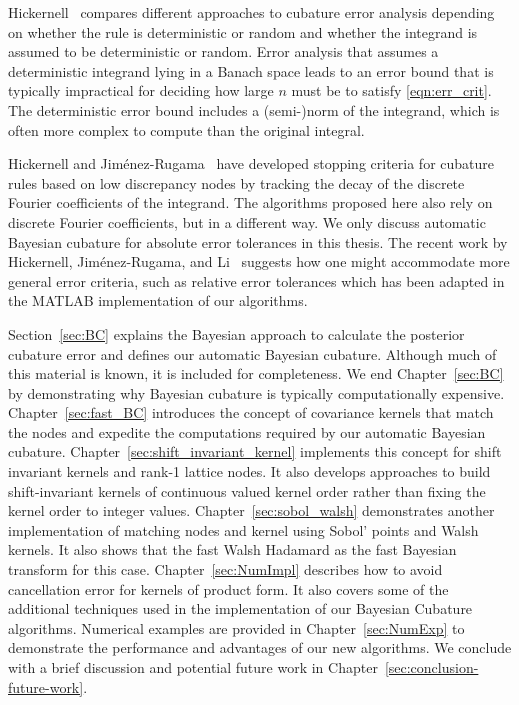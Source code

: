 \documentclass{svjour3}                     %
\begin{document}

Hickernell~\cite{Hic17a} compares different approaches to cubature error analysis depending on whether the rule is deterministic or random and whether the integrand is assumed to be deterministic or random.  Error analysis that assumes a deterministic integrand lying in a Banach space leads to an error bound that is typically impractical for deciding how large $n$ must be to satisfy \eqref{eqn:err_crit}.  The deterministic error bound includes a (semi-)norm of the integrand, which is often more complex to compute than the original integral.

Hickernell and Jim\'enez-Rugama~\cite{HicJim16a,JimHic16a} have developed stopping criteria for cubature rules based on low discrepancy nodes by tracking the decay of the discrete Fourier coefficients of the integrand.  The algorithms proposed here also rely on discrete Fourier coefficients, but in a different way.  We only discuss automatic Bayesian cubature for absolute error tolerances in this thesis. The recent work by Hickernell, Jim\'enez-Rugama, and Li~\cite{HicEtal17a} suggests how one might accommodate more general error criteria, such as relative error tolerances which has been adapted in the MATLAB implementation of our algorithms.

Section~\ref{sec:BC} explains the Bayesian approach to calculate the posterior cubature error and defines our automatic Bayesian cubature. Although much of this material is known, it is included for completeness.  We end Chapter~\ref{sec:BC}  by demonstrating why Bayesian cubature is typically computationally expensive.
Chapter~\ref{sec:fast_BC}  introduces the concept of covariance kernels that match the nodes and expedite the computations required by our automatic Bayesian cubature. 
Chapter~\ref{sec:shift_invariant_kernel} implements this concept for shift invariant kernels and rank-1 lattice nodes. It also develops approaches to build shift-invariant kernels of continuous valued kernel order rather than fixing the kernel order to integer values.
Chapter~\ref{sec:sobol_walsh} demonstrates another implementation of matching nodes and kernel using Sobol' points and Walsh kernels. It also shows that the fast Walsh Hadamard as the fast Bayesian transform for this case.
Chapter~\ref{sec:NumImpl} describes how to avoid cancellation error for kernels of product form. 
It also covers  some of the additional techniques used in the implementation of our Bayesian Cubature algorithms. 
Numerical examples are provided in Chapter~\ref{sec:NumExp} to demonstrate the performance and advantages of our new algorithms.  We conclude with a brief discussion and potential future work in Chapter~\ref{sec:conclusion-future-work}.
\end{document}
